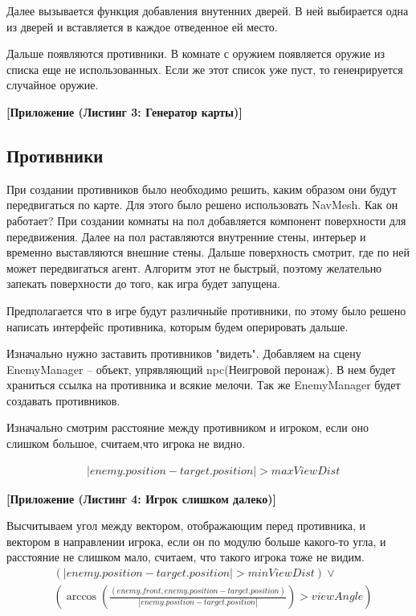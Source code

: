 \documentclass[14pt, titlepage,fleqn,a4paper]{extarticle}
\begin{document}
    Далее вызывается функция добавления внутенних дверей. В ней выбирается одна из дверей и вставляется в каждое отведенное ей место. 
    
    Дальше появляются противники. В комнате с оружием появляется оружие из списка еще не использованных. Если же этот список уже пуст, то гененрируется случайное оружие.
    
    \textbf{[Приложение (Листинг 3: Генератор карты)]}
    
    \subsection*{Противники}
	При создании противников было необходимо решить, каким образом они будут передвигаться по карте. Для этого было решено использовать NavMesh. Как он работает? При создании комнаты на пол добавляется компонент поверхности для передвижения. Далее на пол раставляются внутренние стены, интерьер и временно выставляются внешние стены. Дальше поверхность смотрит, где по ней может передвигаться агент. Алгоритм этот не быстрый, поэтому желательно запекать поверхности до того, как игра будет запущена. 
	
	Предполагается что в игре будут различныйе противники, по этому было решено написать интерфейс противника, которым будем оперировать дальше.
	
    Изначально нужно заставить противников "видеть". Добавляем на сцену EnemyManager -- объект, упрявляющий npc(Неигровой перонаж). В нем будет храниться ссылка на противника и  всякие мелочи. Так же EnemyManager будет создавать противников. 
    
    Изначально смотрим расстояние между противником и игроком, если оно слишком большое, считаем,что игрока не видно.
    
    \begin{align*}
        &|enemy.position - target.position| > maxViewDist
    \end{align*}
    
    \textbf{[Приложение (Листинг 4: Игрок слишком далеко)]}
    
    Высчитываем угол между вектором, отображающим перед противника, и вектором в направлении игрока, если он по модулю больше какого-то угла, и расстояние не слишком мало, считаем, что такого игрока тоже не видим. 
    \begin{align*}
        &\left(|enemy.position - target.position| > minViewDist\right) \lor \\
        & \left(\arccos(\frac{(enemy.front, enemy.position - target.position) }{|enemy.position - target.position|}) > viewAngle\right)
    \end{align*}
    
\end{document}
